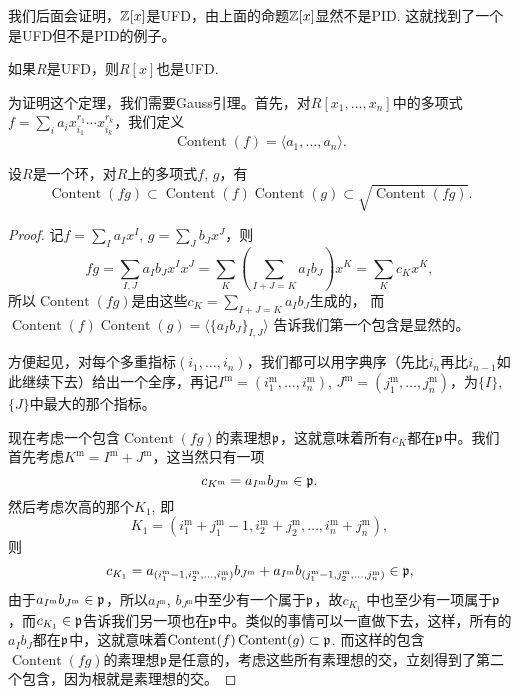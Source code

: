 我们后面会证明，$\mathbb{Z}[x]$是UFD，由上面的命题$\mathbb{Z}[x]$显然不是PID. 这就找到了一个是UFD但不是PID的例子。

\begin{thm}\label{ufd}
如果$R$是UFD，则$R[x]$也是UFD.
\end{thm}

为证明这个定理，我们需要Gauss引理。首先，对$R[x_1,\dots,x_n]$中的多项式$f=\sum_{i}a_ix^{r_1}_{i_1}\cdots x_{i_k}^{r_k}$，我们定义
\[
	\operatorname{Content}(f)=\langle a_1,\dots,a_n\rangle.
\]

\begin{lem}
	设$R$是一个环，对$R$上的多项式$f$, $g$，有
	\[
		\operatorname{Content}(fg)\subset
		\operatorname{Content}(f)\operatorname{Content}(g)
		\subset \sqrt{\operatorname{Content}(fg)}.
	\]
\end{lem}

\begin{proof}
	记$f=\sum_I a_I x^I$, $g=\sum_J b_J x^J$，则
	\[
		fg=\sum_{I,J}a_Ib_J x^Ix^J
		=\sum_{K}\left(\sum_{I+J=K}a_Ib_J\right)x^K
		=\sum_{K}c_Kx^K,
	\]
	所以$\operatorname{Content}(fg)$是由这些$c_K=\sum_{I+J=K}a_Ib_J$生成的，
	而$\operatorname{Content}(f)\operatorname{Content}(g)=\langle \{a_Ib_J\}_{I,J}\rangle$
	告诉我们第一个包含是显然的。

	方便起见，对每个多重指标$(i_1,\dots,i_n)$，我们都可以用字典序（先比$i_n$再比$i_{n-1}$如此继续下去）给出一个全序，再记$I^\text{m}=(i^\text{m}_1,\dots,i^\text{m}_n)$, $J^\text{m}=(j^\text{m}_1,\dots,j^\text{m}_n)$，为$\{I\}$, $\{J\}$中最大的那个指标。

	现在考虑一个包含$\operatorname{Content}(fg)$的素理想$\mathfrak{p}$，这就意味着所有$c_K$都在$\mathfrak{p}$中。我们首先考虑$K^\text{m}=I^\text{m}+J^\text{m}$，这当然只有一项
	\[
		c_{K^\text{m}}=a_{I^\text{m}}b_{J^\text{m}}\in \mathfrak{p}.
	\]
	然后考虑次高的那个$K_1$, 即
	\[
		K_{1}=(i^\text{m}_1+j^\text{m}_1-1,i^\text{m}_2+j^\text{m}_2,\dots,
		i^\text{m}_n+j^\text{m}_n),
	\]
	则
	\[
		c_{K_{1}}=a_{(i^\text{m}_1-1,i^\text{m}_2,\dots,
		i^\text{m}_n)}b_{J^\text{m}}+a_{I^\text{m}}b_{(j^\text{m}_1-1,j^\text{m}_2,\dots,j^\text{m}_n)}\in \mathfrak{p},
	\]
	由于$a_{I^\text{m}}b_{J^\text{m}}\in \mathfrak{p}$，所以$a_{I^\text{m}}$, $b_{J^\text{m}}$中至少有一个属于$\mathfrak{p}$，故$c_{K_{1}}$
	中也至少有一项属于$\mathfrak{p}$，而$c_{K_{1}}\in \mathfrak{p}$告诉我们另一项也在$\mathfrak{p}$中。类似的事情可以一直做下去，这样，所有的$a_Ib_J$都在$\mathfrak{p}$中，这就意味着$\operatorname{Content}(f)\operatorname{Content}(g)\subset\mathfrak{p}$.
	而这样的包含$\operatorname{Content}(fg)$的素理想$\mathfrak{p}$是任意的，考虑这些所有素理想的交，立刻得到了第二个包含，因为根就是素理想的交。
\end{proof}

